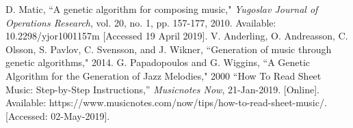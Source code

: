 \documentclass[conference]{IEEEtran}
\begin{document}
\begin{thebibliography}{00}
 D. Matic, ``A genetic algorithm for composing music," \textit{Yugoslav Journal of Operations Research}, vol. 20, no. 1, pp. 157-177, 2010. Available: 10.2298/yjor1001157m [Accessed 19 April 2019].
V. Anderling, O. Andreasson, C. Olsson, S. Pavlov, C. Svensson, and J. Wikner, ``Generation of music through genetic algorithms," 2014.
G. Papadopoulos and G. Wiggins, ``A Genetic Algorithm for the Generation of Jazz Melodies," 2000
“How To Read Sheet Music: Step-by-Step Instructions,” \textit{Musicnotes Now}, 21-Jan-2019. [Online]. Available: https://www.musicnotes.com/now/tips/how-to-read-sheet-music/. [Accessed: 02-May-2019].
\end{thebibliography}
\end{document}
